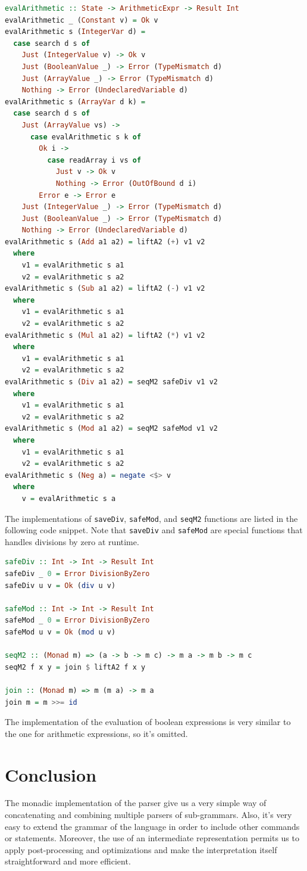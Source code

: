 \documentclass[12pt,a4paper]{article}
\begin{document}
\begin{lstlisting}[language=Haskell, style=custom-style]
evalArithmetic :: State -> ArithmeticExpr -> Result Int
evalArithmetic _ (Constant v) = Ok v
evalArithmetic s (IntegerVar d) =
  case search d s of
    Just (IntegerValue v) -> Ok v
    Just (BooleanValue _) -> Error (TypeMismatch d)
    Just (ArrayValue _) -> Error (TypeMismatch d)
    Nothing -> Error (UndeclaredVariable d)
evalArithmetic s (ArrayVar d k) =
  case search d s of
    Just (ArrayValue vs) ->
      case evalArithmetic s k of
        Ok i ->
          case readArray i vs of
            Just v -> Ok v
            Nothing -> Error (OutOfBound d i)
        Error e -> Error e
    Just (IntegerValue _) -> Error (TypeMismatch d)
    Just (BooleanValue _) -> Error (TypeMismatch d)
    Nothing -> Error (UndeclaredVariable d)
evalArithmetic s (Add a1 a2) = liftA2 (+) v1 v2
  where
    v1 = evalArithmetic s a1
    v2 = evalArithmetic s a2
evalArithmetic s (Sub a1 a2) = liftA2 (-) v1 v2
  where
    v1 = evalArithmetic s a1
    v2 = evalArithmetic s a2
evalArithmetic s (Mul a1 a2) = liftA2 (*) v1 v2
  where
    v1 = evalArithmetic s a1
    v2 = evalArithmetic s a2
evalArithmetic s (Div a1 a2) = seqM2 safeDiv v1 v2
  where
    v1 = evalArithmetic s a1
    v2 = evalArithmetic s a2
evalArithmetic s (Mod a1 a2) = seqM2 safeMod v1 v2
  where
    v1 = evalArithmetic s a1
    v2 = evalArithmetic s a2
evalArithmetic s (Neg a) = negate <$> v
  where
    v = evalArithmetic s a
\end{lstlisting}
The implementations of \texttt{saveDiv}, \texttt{safeMod}, and \texttt{seqM2} functions are listed in the following code snippet.
Note that \texttt{saveDiv} and \texttt{safeMod} are special functions that handles divisions by zero at runtime.
\begin{lstlisting}[language=Haskell, style=custom-style]
safeDiv :: Int -> Int -> Result Int
safeDiv _ 0 = Error DivisionByZero
safeDiv u v = Ok (div u v)

safeMod :: Int -> Int -> Result Int
safeMod _ 0 = Error DivisionByZero
safeMod u v = Ok (mod u v)

seqM2 :: (Monad m) => (a -> b -> m c) -> m a -> m b -> m c
seqM2 f x y = join $ liftA2 f x y

join :: (Monad m) => m (m a) -> m a
join m = m >>= id
\end{lstlisting}
The implementation of the evaluation of boolean expressions is very similar to the one for arithmetic expressions, so it's omitted.

\section*{Conclusion}
The monadic implementation of the parser give us a very simple way of concatenating and combining multiple parsers of sub-grammars.
Also, it's very easy to extend the grammar of the language in order to include other commands or statements.
Moreover, the use of an intermediate representation permits us to apply post-processing and optimizations and make the interpretation itself straightforward and more efficient.
\end{document}
